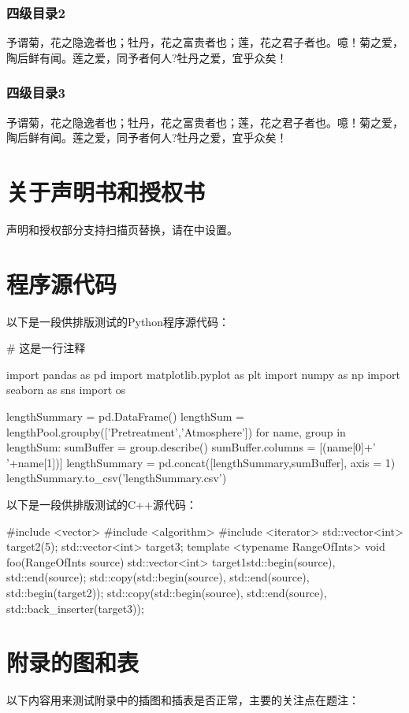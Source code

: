 \subsubsection{四级目录2}
予谓菊，花之隐逸者也；牡丹，花之富贵者也；莲，花之君子者也。噫！菊之爱，陶后鲜有闻。莲之爱，同予者何人?牡丹之爱，宜乎众矣！
\subsubsection{四级目录3}
予谓菊，花之隐逸者也；牡丹，花之富贵者也；莲，花之君子者也。噫！菊之爱，陶后鲜有闻。莲之爱，同予者何人?牡丹之爱，宜乎众矣！

\section{关于声明书和授权书}
声明和授权部分支持扫描页替换，请在中设置。

\section{程序源代码}
以下是一段供排版测试的Python程序源代码：
\begin{Python}
# 这是一行注释

import pandas as pd
import matplotlib.pyplot as plt
import numpy as np
import seaborn as sns
import os

lengthSummary = pd.DataFrame()
lengthSum = lengthPool.groupby(['Pretreatment','Atmosphere'])
for name, group in lengthSum:
	sumBuffer = group.describe()
	sumBuffer.columns = [(name[0]+' '+name[1])]
	lengthSummary = pd.concat([lengthSummary,sumBuffer], axis = 1)
lengthSummary.to_csv('lengthSummary.csv')

\end{Python}

以下是一段供排版测试的C++源代码：

\begin{C++}
#include <vector>
#include <algorithm>
#include <iterator>
std::vector<int> target2(5);
std::vector<int> target3;
template <typename RangeOfInts>
void foo(RangeOfInts source)
{
	std::vector<int> target1{std::begin(source),
		std::end(source)};
	std::copy(std::begin(source), std::end(source),
	std::begin(target2));
	std::copy(std::begin(source), std::end(source),
	std::back_inserter(target3));
}
\end{C++}

\section{附录的图和表}
以下内容用来测试附录中的插图和插表是否正常，主要的关注点在题注：

